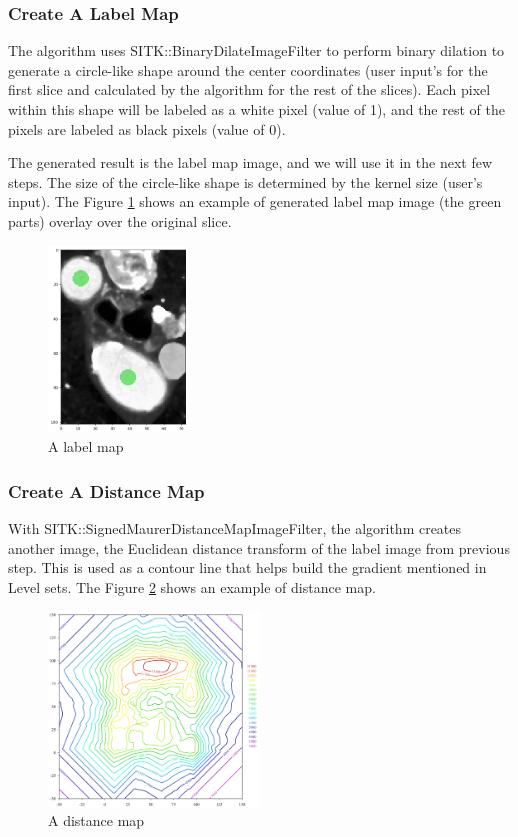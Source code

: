 \subsubsection{Create A Label Map}
The algorithm uses SITK::BinaryDilateImageFilter to perform binary dilation to generate a circle-like shape around the center coordinates (user input’s for the first slice and calculated by the algorithm for the rest of the slices). Each pixel within this shape will be labeled as a white pixel (value of 1), and the rest of the pixels are labeled as black pixels (value of 0). 

The generated result is the label map image, and we will use it in the next few steps. The size of the circle-like shape is determined by the kernel size (user's input). The Figure \ref{fig_label_map} shows an example of generated label map image (the green parts) overlay over the original slice.

\begin{figure}[H]
    \centering
    \includegraphics[width=0.33\textwidth]{figures/AGR/label_image.png}
    \caption[A label image]{A label map}
    \label{fig_label_map}
\end{figure}

\subsubsection{Create A Distance Map}\label{distance_map}
With SITK::SignedMaurerDistanceMapImageFilter, the algorithm creates another image, the Euclidean distance transform of the label image from previous step. This is used as a contour line that helps build the gradient mentioned in Level sets. The Figure \ref{fig_distance_map} shows an example of distance map.

\begin{figure}[H]
    \centering
    \includegraphics[width=0.5\textwidth]{figures/AGR/Contour2D.png}
    \caption[A distance map]{A distance map}
    \label{fig_distance_map}
\end{figure}

